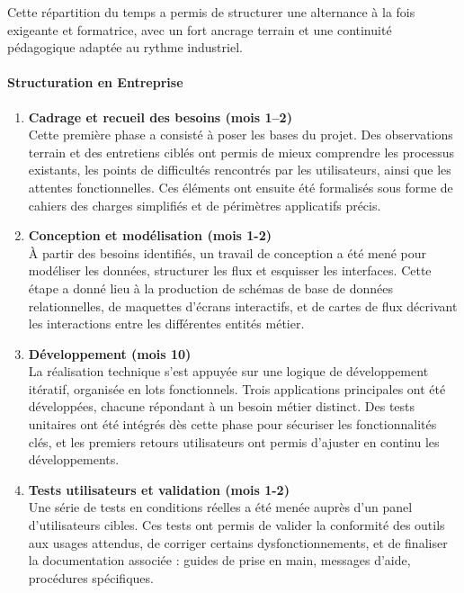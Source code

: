 \documentclass[11pt,a4paper]{article}
\begin{document}
Cette répartition du temps a permis de structurer une alternance à la fois exigeante et formatrice, avec un fort ancrage terrain et une continuité pédagogique adaptée au rythme industriel.
\\

\paragraph{Structuration en Entreprise}

\begin{enumerate}
    \item \textbf{Cadrage et recueil des besoins (mois 1–2)}\\
    Cette première phase a consisté à poser les bases du projet. Des observations terrain et des entretiens ciblés ont permis de mieux comprendre les processus existants, les points de difficultés rencontrés par les utilisateurs, ainsi que les attentes fonctionnelles. Ces éléments ont ensuite été formalisés sous forme de cahiers des charges simplifiés et de périmètres applicatifs précis.

    \item \textbf{Conception et modélisation (mois 1-2)}\\
    À partir des besoins identifiés, un travail de conception a été mené pour modéliser les données, structurer les flux et esquisser les interfaces. Cette étape a donné lieu à la production de schémas de base de données relationnelles, de maquettes d’écrans interactifs, et de cartes de flux décrivant les interactions entre les différentes entités métier.

    \item \textbf{Développement  (mois 10)}\\
    La réalisation technique s’est appuyée sur une logique de développement itératif, organisée en lots fonctionnels. Trois applications principales ont été développées, chacune répondant à un besoin métier distinct. Des tests unitaires ont été intégrés dès cette phase pour sécuriser les fonctionnalités clés, et les premiers retours utilisateurs ont permis d’ajuster en continu les développements.

    \item \textbf{Tests utilisateurs et validation (mois 1-2)}\\
    Une série de tests en conditions réelles a été menée auprès d’un panel d’utilisateurs cibles. Ces tests ont permis de valider la conformité des outils aux usages attendus, de corriger certains dysfonctionnements, et de finaliser la documentation associée : guides de prise en main, messages d’aide, procédures spécifiques.


\end{enumerate}
\end{document}
